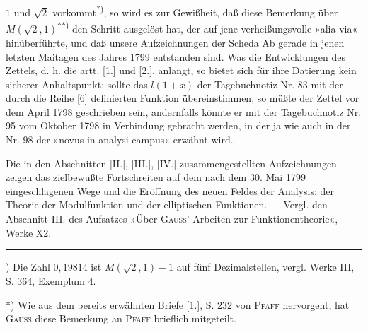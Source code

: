 \clearpage
\fancyhead{}
\noindent $1$ und $\surd2$ vorkommt\textsuperscript{*)}, so wird es zur Gewißheit, daß diese Bemerkung über $M(\surd2,1)$\textsuperscript{**)} den Schritt ausgelöst hat, der auf jene verheißungsvolle »alia via« hinüberführte, und daß unsere Aufzeichnungen der Scheda Ab gerade in jenen letzten Maitagen des Jahres 1799 entstanden sind. Was die Entwicklungen des Zettels, d. h. die artt. [1.] und [2.], anlangt, so bietet sich für ihre Datierung kein sicherer Anhaltspunkt; sollte das $l(1+x)$ der Tagebuchnotiz Nr. 83 mit der durch die Reihe [6] definierten Funktion übereinstimmen, so müßte der Zettel vor dem April 1798 geschrieben sein, andernfalls könnte er mit der Tagebuchnotiz Nr. 95 vom Oktober 1798 in Verbindung gebracht werden, in der ja wie auch in der Nr. 98 der »novus in analysi campus« erwähnt wird.
\par\indent Die in den Abschnitten [II.], [III.], [IV.] zusammengestellten Aufzeichnungen zeigen das zielbewußte Fortschreiten auf dem nach dem 30. Mai 1799 eingeschlagenen Wege und die Eröffnung des neuen Feldes der Analysis: der Theorie der Modulfunktion und der elliptischen Funktionen. — Vergl. den Abschnitt III. des Aufsatzes »Über \textsc{Gauss}’ Arbeiten zur Funktionentheorie«, Werke X2.
\vfill
\par\smallskip\noindent\rule{.25\linewidth}{.4pt}\par
{\small
\par\indent *) Die Zahl $0{,}19814$ ist $M(\surd2,1)-1$ auf fünf Dezimalstellen, vergl. Werke III, S. 364, Exemplum 4.
\par\indent **) Wie aus dem bereits erwähnten Briefe [1.], S. 232 von \textsc{Pfaff} hervorgeht, hat \textsc{Gauss} diese Bemerkung an \textsc{Pfaff} brieflich mitgeteilt.
\par}
\clearpage
\endgroup
